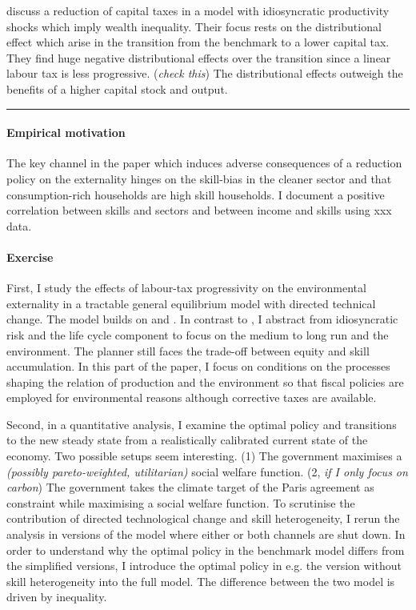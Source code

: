\cite{Domeij2004OnTaxes} discuss a reduction of capital taxes in a model with idiosyncratic productivity shocks which imply  wealth inequality. Their focus rests on the distributional effect which arise in the transition from the benchmark to a lower capital tax. They find huge negative distributional effects over the transition since a linear labour tax is less progressive.  (\textit{check this}) The distributional effects outweigh the benefits of a higher capital stock and output. 
\\

\noindent\rule[1ex]{\textwidth}{1pt}

\paragraph{Empirical motivation}
The key channel in the paper which induces adverse consequences of a reduction policy on the externality hinges on the skill-bias in the cleaner sector and that consumption-rich households are high skill households. I document a positive correlation between skills and sectors and between income and skills using xxx data.

\paragraph{Exercise}
First, I study the effects of labour-tax progressivity  on the environmental externality in a tractable general equilibrium model with directed technical change. The model builds on \cite{Heathcote2017OptimalFramework} and \cite{Acemoglu2012TheChange}. 
In contrast to \cite{Heathcote2017OptimalFramework}, I abstract from idiosyncratic risk and the life cycle component to focus on the medium to long run and the environment. 
The planner still faces the trade-off between equity and skill accumulation. 
In this part of the paper, I focus on conditions on the processes shaping the relation of production and the environment so that fiscal policies are employed for environmental reasons although corrective taxes are available.  

Second, in a quantitative analysis, I examine the optimal policy and transitions to the new steady state from a realistically calibrated current state of the economy. Two possible setups seem interesting. (1) The government maximises a \textit{(possibly pareto-weighted, utilitarian)} social welfare function. (2, \textit{if I only focus on carbon}) The government takes the climate target of the Paris agreement as constraint while maximising a social welfare function.  
To scrutinise the contribution of directed technological change and skill heterogeneity, I rerun the analysis in versions of the model where either or both channels are shut down. In order to understand why the optimal policy in the benchmark model differs from the simplified versions, I introduce the optimal policy in e.g. the version without skill heterogeneity into the full model. The difference between the two model is driven by inequality. 

